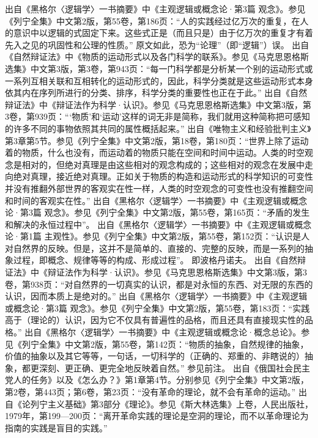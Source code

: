 \begin{maonote}
出自《黑格尔〈逻辑学〉一书摘要》中《主观逻辑或概念论·第3篇 观念》。参见《列宁全集》中文第2版，第55卷，第186页：“人的实践经过亿万次的重复，在人的意识中以逻辑的式固定下来。这些式正是（而且只是）由于亿万次的重复才有着先入之见的巩固性和公理的性质。”
原文如此，恐为“论理”（即“逻辑”）误。
出自《自然辩证法》中《物质的运动形式以及各门科学的联系》。参见《马克思恩格斯选集》中文第3版，第3卷，第943页：“每一门科学都是分析某一个别的运动形式或一系列互相关联和互相转化的运动形式的，因此，科学分类就是这些运动形式本身依其内在序列所进行的分类、排序，科学分类的重要性也正在于此。”
出自《自然辩证法》中《辩证法作为科学·认识》。参见《马克思恩格斯选集》中文第3版，第3卷，第939页：“‘物质’和‘运动’这样的词无非是简称，我们就用这种简称把可感知的许多不同的事物依照其共同的属性概括起来。”
出自《唯物主义和经验批判主义》第3章第5节。参见《列宁全集》中文第2版，第18卷，第180页：“世界上除了运动着的物质，什么也没有，而运动着的物质只能在空间和时间中运动。人类的时空观念是相对的，但绝对真理是由这些相对的观念构成的；这些相对的观念在发展中走向绝对真理，接近绝对真理。正如关于物质的构造和运动形式的科学知识的可变性并没有推翻外部世界的客观实在性一样，人类的时空观念的可变性也没有推翻空间和时间的客观实在性。”
出自《黑格尔〈逻辑学〉一书摘要》中《主观逻辑或概念论·第3篇 观念》。参见《列宁全集》中文第2版，第55卷，第165页：“矛盾的发生和解决的永恒过程中”。
出自《黑格尔〈逻辑学〉一书摘要》中《主观逻辑或概念论·第1篇 主观性》。参见《列宁全集》中文第2版，第55卷，第152页：“认识是人对自然界的反映。但是，这并不是简单的、直接的、完整的反映，而是一系列的抽象过程，即概念、规律等等的构成、形成过程”。
即波格丹诺夫。
出自《自然辩证法》中《辩证法作为科学·认识》。参见《马克思恩格斯选集》中文第3版，第3卷，第938页：“对自然界的一切真实的认识，都是对永恒的东西、对无限的东西的认识，因而本质上是绝对的。”
出自《黑格尔〈逻辑学〉一书摘要》中《主观逻辑或概念论·第3篇 观念》。参见《列宁全集》中文第2版，第55卷，第183页：“实践高于（理论的）认识，因为它不仅具有普遍性的品格，而且还具有直接现实性的品格。”
出自《黑格尔〈逻辑学〉一书摘要》中《主观逻辑或概念论·概念总论》。参见《列宁全集》中文第2版，第55卷，第142页：“物质的抽象，自然规律的抽象，价值的抽象以及其它等等，一句话，一切科学的（正确的、郑重的、非瞎说的）抽象，都更深刻、更正确、更完全地反映着自然。”
参见前注。
出自《俄国社会民主党人的任务》以及《怎么办？》第1章第4节。分别参见《列宁全集》中文第2版，第2卷，第443页；第6卷，第23页：“没有革命的理论，就不会有革命的运动。”
出自《论列宁主义基础》第3部分《理论》。参见《斯大林选集》上卷，人民出版社，1979年，第199—200页：“离开革命实践的理论是空洞的理论，而不以革命理论为指南的实践是盲目的实践。”

\end{maonote}
